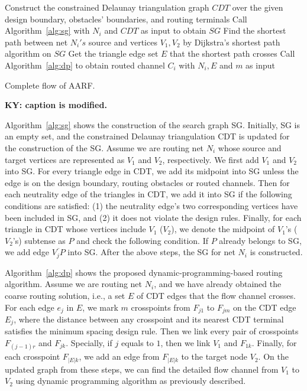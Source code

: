 \documentclass[journal]{IEEEtran}
\begin{document}
\begin{algorithm2e}[h]
\small
{}
Construct the constrained Delaunay triangulation graph $CDT$ over the given 
design boundary, obstacles' boundaries, and routing terminals\;
{
	Call Algorithm~\ref{alg:sg} with $N_i$ and $CDT$ as input to obtain $SG$\;
	Find the shortest path between net $N_i's$ source and vertices $V_1, V_2$ by Dijkstra's shortest path algorithm on $SG$\;
	Get the triangle edge set $E$ that the shortest path crosses\;
	Call Algorithm~\ref{alg:dp} to obtain routed channel $C_i$ with $N_i, E$ and $m$ as input\;
}
\caption{Complete flow of AARF.}
\label{alg:aarf}
\end{algorithm2e}

{\bf KY: caption is modified.}

Algorithm~\ref{alg:sg} shows the construction of the search graph SG. 
Initially, SG is an empty set, and the constrained Delaunay triangulation CDT is updated for the construction of the SG. 
Assume we are routing net $N_i$ whose source and target vertices are represented as $V_1$ and $V_2$, respectively.
We first add $V_1$ and $V_2$ into SG. 
For every triangle edge in CDT, we add its midpoint into SG unless the edge is on the design boundary, routing obstacles or routed channels. 
Then for each neutrality edge of the triangles in CDT, we add it into SG if the following conditions are satisfied: (1) the neutrality edge's two corresponding vertices have been included in SG, and (2) it does not violate the design rules. 
Finally, for each triangle in CDT whose vertices include $V_1$ ($V_2$), we denote the midpoint of $V_1$'s ($V_2$'s) subtense as $P$ and check the following condition. 
If $P$ already belongs to SG, we add edge $\overline{V_jP}$ into SG. 
After the above steps, the SG for net $N_i$ is constructed. 

Algorithm~\ref{alg:dp} shows the proposed dynamic-programming-based routing algorithm. 
Assume we are routing net $N_i$, and we have already obtained the coarse routing solution, i.e., a set $E$ of CDT edges that the flow channel crosses. 
For each edge $e_j$ in $E$, we mark $m$ crosspoints from $F_{j1}$ to $F_{jm}$ on the CDT edge $E_j$, where the distance between any crosspoint and its nearest CDT terminal satisfies the minimum spacing design rule. 
Then we link every pair of crosspoints $F_{(j-1)r}$ and $F_{jk}$. Specially, if $j$ equals to $1$, then we link $V_1$ and $F_{1k}$. 
Finally, for each crosspoint $F_{|E|k}$, we add an edge from $F_{|E|k}$ to the target node $V_2$. On the updated graph from these steps, we can find the detailed flow channel from $V_1$ to $V_2$ using dynamic programming algorithm as previously described.
\end{document}
